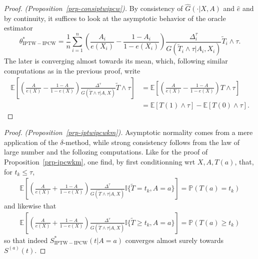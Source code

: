 \documentclass[
  11pt,
  a4paper,
]{article}
\theoremstyle{plain}
\theoremstyle{plain}
\theoremstyle{plain}
\theoremstyle{definition}
\theoremstyle{remark}
\begin{document}
\begin{proof}
\emph{(Proposition~\ref{prp-consiptwipcw}).} By consistency of
\(\widehat G(\cdot|X,A)\) and \(\widehat e\) and by continuity, it
suffices to look at the asymptotic behavior of the oracle estimator \[
\theta^*_{\mathrm{IPTW-IPCW}} = \frac1n\sum_{i=1}^n  \left(\frac{A_i}{ e(X_i)}-\frac{1-A_i}{1-e(X_i)} \right)\frac{\Delta_i^\tau}{G(\widetilde T_i \wedge \tau | A_i,X_i)} \widetilde T_i \wedge \tau.
\] The later is converging almost towards its mean, which, following
similar computations as in the previous proof, write \[
\begin{aligned}
\mathbb{E}\left[\left(\frac{A}{e(X)}-\frac{1-A}{1-e(X)} \right)\frac{\Delta^\tau}{G(\widetilde T \wedge \tau | A,X)} \widetilde T \wedge \tau\right]  
&= \mathbb{E}\left[\left(\frac{A}{e(X)}-\frac{1-A}{1-e(X)} \right) T \wedge \tau\right] \\
&= \mathbb{E}\left[T(1) \wedge \tau\right]-\mathbb{E}\left[T(0) \wedge \tau\right].
\end{aligned}
\]
\end{proof}

\begin{proof}
\emph{(Proposition~\ref{prp-iptwipcwkm}).} Asymptotic normality comes
from a mere application of the \(\delta\)-method, while strong
consistency follows from the law of large number and the follozing
computations. Like for the proof of Proposition~\ref{prp-ipcwkm}, one
find, by first conditionning wrt \(X,A,T(a)\), that, for
\(t_k \leqslant\tau\), \[
\begin{aligned}
\mathbb{E}\left[\left(\frac{A}{e(X)}+\frac{1-A}{1-e(X)} \right)\frac{\Delta^\tau}{G(\widetilde T \wedge \tau | A,X)} \mathbb{I}\{\widetilde T = t_k, A=a\}\right] = \mathbb{P}(T(a)=t_k)
\end{aligned}
\] and likewise that \[
\begin{aligned}
\mathbb{E}\left[\left(\frac{A}{e(X)}+\frac{1-A}{1-e(X)} \right)\frac{\Delta^\tau}{G(\widetilde T \wedge \tau | A,X)} \mathbb{I}\{\widetilde T \geqslant t_k, A=a\}\right] = \mathbb{P}(T(a)\geqslant t_k)
\end{aligned}
\] so that indeed \(S^*_{\mathrm{IPTW-IPCW}} (t|A=a)\) converges almost
surely towards \(S^{(a)}(t)\).
\end{proof}
\end{document}
